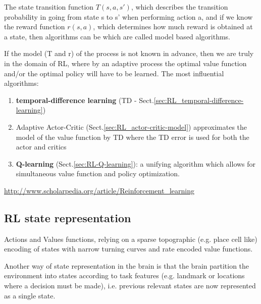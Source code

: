 The state transition function $T(s,a,s')$, which describes the transition
probability in going from state s to s' when performing action a, and if we know
the reward function $r(s,a)$, which determines how much reward is obtained at a
state, then algorithms can be which are called model based algorithms.

If the model (T and r) of the process is not known in advance, then we are truly
in the domain of RL, where by an adaptive process the optimal value function
and/or the optimal policy will have to be learned. The most influential
algorithms:

\begin{enumerate}
%   
% 
% 
  
  \item  {\bf temporal-difference learning} (TD -
  Sect.\ref{sec:RL_temporal-difference-learning})

  \item Adaptive Actor-Critic (Sect.\ref{sec:RL_actor-critic-model})
   approximates the model of the value function by TD where the TD error is used
  for both the actor and critics
  
  \item {\bf Q-learning} (Sect.\ref{sec:RL-Q-learning}):  a unifying algorithm
  which allows for simultaneous value function and policy optimization. 
\end{enumerate}

\url{http://www.scholarpedia.org/article/Reinforcement_learning}
 

\subsection{RL state representation}

Actions and Values functions, relying on a sparse topographic (e.g. place cell
like)  encoding of states with narrow turning curves and rate encoded value
functions.

Another way of state representation in the brain is that the brain partition the
environment into states according to task features (e.g. landmark or locations
where a decision must be made), i.e. previous relevant states  are now
represented as a single state.



